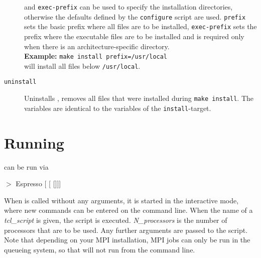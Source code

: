 \begin{description}
  and \texttt{exec-prefix} can be used to specify the installation
  directories, otherwise the defaults defined by the
  \texttt{configure} script are used. \texttt{prefix} sets the basic
  prefix where all \es{} files are to be installed,
  \texttt{exec-prefix} sets the prefix where the executable files are
  to be installed and is required only when there is an
  architecture-specific directory.\\
  \textbf{Example:} \verb!make install prefix=/usr/local!\\
  will install all files below \texttt{/usr/local}.
\item[\texttt{uninstall}] Uninstalls \es{}, \ie{} removes all files
  that were installed during \texttt{make install}. The variables are
  identical to the variables of the \texttt{install}-target.
\end{description}

\section{Running \es}
\label{sec:run}

\es{} can be run via
\begin{syntax}
$>$ Espresso [ [ []]]
\end{syntax}

 When \es{} is called without any arguments,
it is started in the interactive mode, where new commands can be
entered on the command line. When the name of a \textit{tcl\_script}
is given, the script is executed. \textit{N\_processors} is the number
of processors that are to be used. Any further arguments are passed to
the script. Note that depending on your MPI installation, MPI jobs can
only be run in the queueing system, so that \es{} will not run from
the command line.

